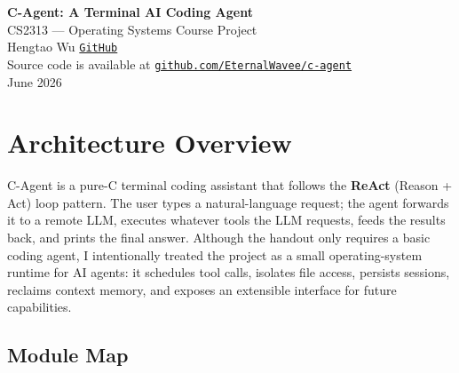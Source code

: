 \documentclass[11pt,a4paper]{article}
\begin{document}
\begin{center}
  {\LARGE\bfseries\color{accent} C-Agent: A Terminal AI Coding Agent}\\[6pt]
  {\large\color{codegray} CS2313 --- Operating Systems Course Project}\\[6pt]
  {\normalsize Hengtao Wu  \quad \href{https://github.com/EternalWavee/c-agent}{\texttt{GitHub}}}\\[3pt]
  {\scriptsize Source code is available at \href{https://github.com/EternalWavee/c-agent}{\texttt{github.com/EternalWavee/c-agent}}}\\[4pt]
  {\normalsize June 2026}
\end{center}
\vspace{-1em}

\section{Architecture Overview}

C-Agent is a pure-C terminal coding assistant that follows the \textbf{ReAct}
(Reason + Act) loop pattern. The user types a natural-language request; the
agent forwards it to a remote LLM, executes whatever tools the LLM requests,
feeds the results back, and prints the final answer. Although the handout only
requires a basic coding agent, I intentionally treated the project as a small
operating-system runtime for AI agents: it schedules tool calls, isolates file
access, persists sessions, reclaims context memory, and exposes an extensible
interface for future capabilities.

\subsection{Module Map}
\end{document}
